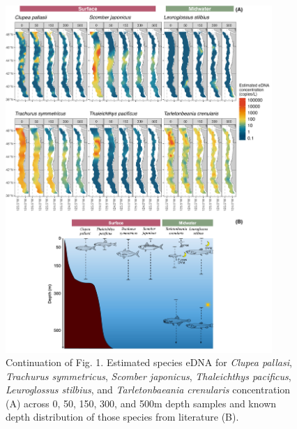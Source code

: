 \documentclass{article}
\begin{document}
\begin{figure}
\centering
\includegraphics[width=0.90\textwidth]{plots/5_Supplementary_Figure_1.jpg}
\caption{Continuation of Fig. 1. Estimated species eDNA for \textit{Clupea pallasi}, \textit{Trachurus symmetricus}, \textit{Scomber japonicus}, \textit{Thaleichthys pacificus}, \textit{Leuroglossus stilbius}, and \textit{Tarletonbaeania crenularis} concentration (A) across 0, 50, 150, 300, and 500m depth samples and known depth distribution of those species from literature (B).}
\end{figure}
\end{document}
